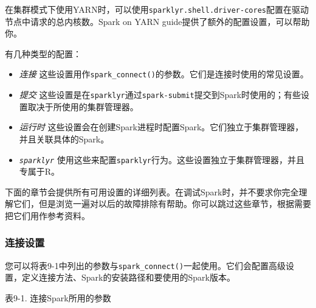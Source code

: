 \documentclass[
]{article}
\providecommand{\tightlist}{%
  \setlength{\itemsep}{0pt}\setlength{\parskip}{0pt}}
\begin{document}
在集群模式下使用YARN时，可以使用\texttt{sparklyr.shell.driver-cores}配置在驱动节点中请求的总内核数。Spark
on YARN guide提供了额外的配置设置，可以帮助你。

有几种类型的配置：

\begin{itemize}
\tightlist
\item
  \emph{连接}
  这些设置用作\texttt{spark\_connect()}的参数。它们是连接时使用的常见设置。
\item
  \emph{提交}
  这些设置是在\texttt{sparklyr}通过\texttt{spark-submit}提交到Spark时使用的；有些设置取决于所使用的集群管理器。
\item
  \emph{运行时}
  这些设置会在创建Spark进程时配置Spark。它们独立于集群管理器，并且关联具体的Spark。
\item
  \emph{\texttt{sparklyr}}
  使用这些来配置\texttt{sparklyr}行为。这些设置独立于集群管理器，并且专属于R。
\end{itemize}

下面的章节会提供所有可用设置的详细列表。在调试Spark时，并不要求你完全理解它们，但是浏览一遍对以后的故障排除有帮助。你可以跳过这些章节，根据需要把它们用作参考资料。

\hypertarget{ux8fdeux63a5ux8bbeux7f6e}{%
\subsubsection{连接设置}\label{ux8fdeux63a5ux8bbeux7f6e}}

您可以将表9-1中列出的参数与\texttt{spark\_connect()}一起使用。它们会配置高级设置，定义连接方法、Spark的安装路径和要使用的Spark版本。

表9-1. 连接Spark所用的参数
\end{document}
